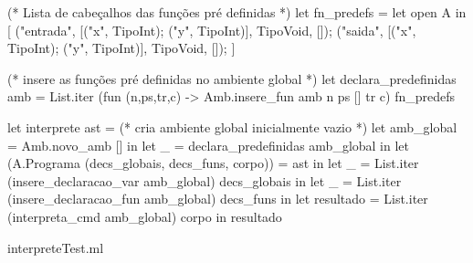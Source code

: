 \documentclass[12pt,a4paper,twoside]{article}
\begin{document}
\begin{terminal}
(* Lista de cabeçalhos das funções pré definidas *)
let fn_predefs = let open A in [
    ("entrada", [("x", TipoInt); ("y", TipoInt)], TipoVoid, []);
    ("saida",     [("x", TipoInt); ("y", TipoInt)], TipoVoid, []);
]

(* insere as funções pré definidas no ambiente global *)
let declara_predefinidas amb =
  List.iter (fun (n,ps,tr,c) -> Amb.insere_fun amb n ps [] tr c) fn_predefs

let interprete ast =
  (* cria ambiente global inicialmente vazio *)
  let amb_global = Amb.novo_amb [] in
  let _ = declara_predefinidas amb_global in
  let (A.Programa (decs_globais, decs_funs, corpo)) = ast in
  let _ = List.iter (insere_declaracao_var amb_global) decs_globais in
  let _ = List.iter (insere_declaracao_fun amb_global) decs_funs in
  let resultado = List.iter (interpreta_cmd amb_global) corpo in
  resultado
\end{terminal}
interpreteTest.ml
\end{document}
